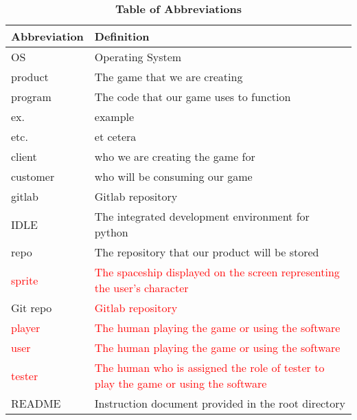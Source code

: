 \documentclass[12pt, titlepage]{article}
\begin{document}
\begin{table}[H]
\caption{\textbf{Table of Abbreviations}} \label{Table}
\begin{tabularx}{\textwidth}{p{3cm}X}
\toprule
\textbf{Abbreviation} & \textbf{Definition} \\
\midrule
OS &  Operating System  \\ \hline
 product & The game that we are creating   \\ \hline
 program & The code that our game uses to function   \\ \hline
 ex. & example \\ \hline
 etc. & et cetera \\ \hline
 client & who we are creating the game for \\ \hline
 customer & who will be consuming our game \\ \hline
 gitlab & Gitlab repository \\ \hline
 IDLE & The integrated development environment for python \\ \hline
 repo & The repository that our product will be stored \\ \hline
\textcolor{red}{sprite} & \textcolor{red}{The spaceship displayed on the screen representing the user's character}  \\ \hline
 Git repo& \textcolor{red}{Gitlab repository} \\ \hline
\textcolor{red}{player} & \textcolor{red}{The human playing the game or using the software}\\ \hline
\textcolor{red}{user} & \textcolor{red}{The human playing the game or using the software}\\ \hline
\textcolor{red}{tester} & \textcolor{red}{The human who is assigned the role of tester to play the game or using the software}\\ \hline
 README & Instruction document provided in the root directory \\
\bottomrule
\end{tabularx}

\end{table}
\end{document}
